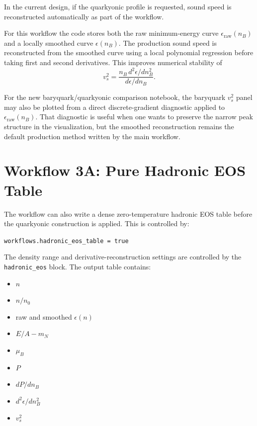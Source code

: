 \documentclass[11pt]{article}
\begin{document}
In the current design, if the quarkyonic profile is requested, sound speed is
reconstructed automatically as part of the workflow.

For this workflow the code stores both the raw minimum-energy curve
$\epsilon_{\mathrm{raw}}(n_B)$ and a locally smoothed curve
$\epsilon(n_B)$.  The production sound speed is reconstructed from the smoothed
curve using a local polynomial regression before taking first and second
derivatives.  This improves numerical stability of
\begin{equation}
v_s^2 = \frac{n_B\, d^2\epsilon/dn_B^2}{d\epsilon/dn_B}.
\end{equation}

For the new baryquark/quarkyonic comparison notebook, the baryquark
$v_s^2$ panel may also be plotted from a direct discrete-gradient diagnostic
applied to $\epsilon_{\mathrm{raw}}(n_B)$.  That diagnostic is useful when one
wants to preserve the narrow peak structure in the visualization, but the
smoothed reconstruction remains the default production method written by the
main workflow.

\section{Workflow 3A: Pure Hadronic EOS Table}

The workflow can also write a dense zero-temperature hadronic EOS table before
the quarkyonic construction is applied.  This is controlled by:

\begin{center}
\texttt{workflows.hadronic\_eos\_table = true}
\end{center}

The density range and derivative-reconstruction settings are controlled by the
\texttt{hadronic\_eos} block.  The output table contains:

\begin{itemize}
\item $n$
\item $n/n_0$
\item raw and smoothed $\epsilon(n)$
\item $E/A - m_N$
\item $\mu_B$
\item $P$
\item $dP/dn_B$
\item $d^2 \epsilon / dn_B^2$
\item $v_s^2$
\end{itemize}
\end{document}
